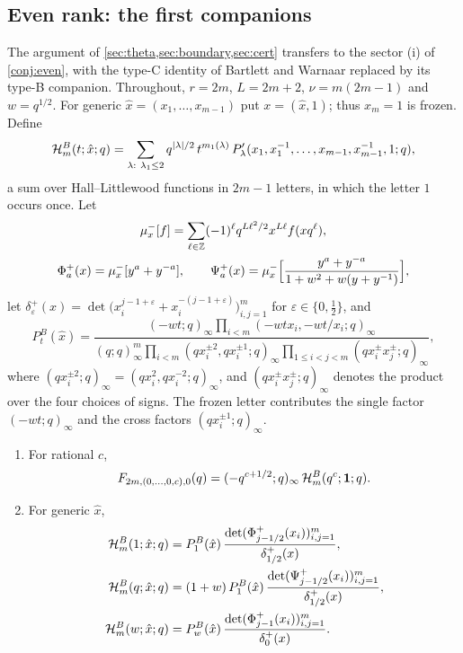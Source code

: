 \subsection{Even rank: the first companions}\label{subsec:evenproof}
The argument of \cref{sec:theta,sec:boundary,sec:cert} transfers to the sector (i) of \cref{conj:even}, with the type-C identity of Bartlett and Warnaar replaced by its type-B companion. Throughout, $r=2m$, $L=2m+2$, $\nu=m(2m-1)$ and $w=q^{1/2}$. For generic $\hat x=(x_1,\dots,x_{m-1})$ put $x=(\hat x,1)$; thus $x_m=1$ is frozen. Define
\[
\HL^B_m(t;\hat x;q)=\sum_{\lambda:\ \lambda_1\le2}q^{|\lambda|/2}\,t^{m_1(\lambda)}\,P'_\lambda(x_1,x_1^{-1},\dots,x_{m-1},x_{m-1}^{-1},1;q),
\]
a sum over Hall--Littlewood functions in $2m-1$ letters, in which the letter $1$ occurs once. Let
\begin{gather*}
\mu^-_x[f]=\sum_{\ell\in\mathbb{Z}}(-1)^\ell q^{L\ell^2/2}x^{L\ell}f(xq^\ell),\\
\Phi^+_a(x)=\mu^-_x[y^a+y^{-a}],\qquad \Psi^+_a(x)=\mu^-_x\Bigl[\frac{y^a+y^{-a}}{1+w^2+w(y+y^{-1})}\Bigr],
\end{gather*}
let $\delta^+_\varepsilon(x)=\det\bigl(x_i^{j-1+\varepsilon}+x_i^{-(j-1+\varepsilon)}\bigr)_{i,j=1}^m$ for $\varepsilon\in\{0,\frac12\}$, and
\[
P^B_t(\hat x)=\frac{(-wt;q)_\infty\prod_{i<m}(-wtx_i,-wt/x_i;q)_\infty}{(q;q)_\infty^m\prod_{i<m}(qx_i^{\pm2},qx_i^{\pm1};q)_\infty\prod_{1\le i<j<m}(qx_i^{\pm}x_j^{\pm};q)_\infty},
\]
where $(qx_i^{\pm2};q)_\infty=(qx_i^2,qx_i^{-2};q)_\infty$, and $(qx_i^\pm x_j^\pm;q)_\infty$ denotes the product over the four choices of signs. The frozen letter contributes the single factor $(-wt;q)_\infty$ and the cross factors $(qx_i^{\pm1};q)_\infty$.

\begin{proposition}\label{prop:evenbd}
\begin{enumerate}
\item For rational $c$,
\[
F_{2m,(0,\dots,0,c),0}(q)=(-q^{c+1/2};q)_\infty\,\mathcal{H}^B_m(q^c;\mathbf{1};q).
\]
\item For generic $\hat x$,
\begin{align*}
\mathcal{H}^B_m(1;\hat x;q)&=P^B_1(\hat x)\,\frac{\det(\Phi^+_{j-1/2}(x_i))_{i,j=1}^m}{\delta^+_{1/2}(x)},\\
\mathcal{H}^B_m(q;\hat x;q)&=(1+w)\,P^B_1(\hat x)\,\frac{\det(\Psi^+_{j-1/2}(x_i))_{i,j=1}^m}{\delta^+_{1/2}(x)},\\
\mathcal{H}^B_m(w;\hat x;q)&=P^B_w(\hat x)\,\frac{\det(\Phi^+_{j-1}(x_i))_{i,j=1}^m}{\delta^+_{0}(x)}.
\end{align*}
\end{enumerate}
\end{proposition}

